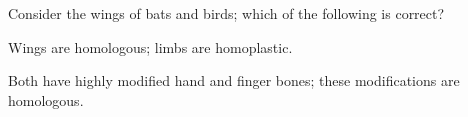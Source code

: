 \begin{frame}
    \begin{clickerquestion}
        \item Consider the wings of bats and birds; which of the following is
            correct?
        \begin{clickeroptions}
            \item {}
            \item Wings are homologous; limbs are homoplastic.
            \item Both have highly modified hand and finger bones; these
                modifications are homologous.
        \end{clickeroptions}
    \end{clickerquestion}
\end{frame}




